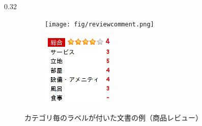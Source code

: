 \documentclass[8pt,unicode]{beamer}
\newcommand{\columnscale}{0.32}
\newcommand{\arrow}{{\color{ttiblue} →}\hspace{1ex}}
\newcommand{\good}[1]{\textbf{\color{orange} #1}}
\newcommand{\keyword}[1]{\textbf{\color{red} #1}}
\begin{document}
\begin{frame}{}
\begin{columns}[t]
\begin{column}{\columnscale\textwidth}
  \begin{figure}
    \begin{subfigure}{0.52\textwidth}
      \texttt{[image: fig/reviewcomment.png]}
    \end{subfigure}
    \begin{subfigure}{0.32\textwidth}
      \includegraphics[width=\textwidth]{fig/reviewpoints.png}
    \end{subfigure}
    \caption{カテゴリ毎のラベルが付いた文書の例（商品レビュー）}
  \end{figure}



\end{column}
\end{columns}
\end{frame}
\end{document}
